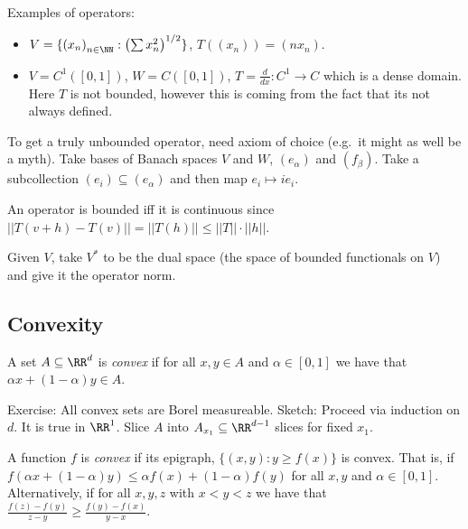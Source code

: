 \documentclass{../uva7310}
\begin{document}
Examples of operators: 
\begin{itemize}
    \item \(V=\{{(x_n)}_{n\in\NN}: {\left(\sum x_n^2\right)}^{1/2}\} \), \(T((x_n))=(nx_n)\).
    \item \(V=C^1([0,1])\), \(W=C([0,1])\), \(T=\frac{d}{dx}:C^1\rightarrow C\) which is a dense domain. Here \(T\) is
    not bounded, however this is coming from the fact that its not always defined.
\end{itemize}

To get a truly unbounded operator, need axiom of choice (e.g.\ it might as well be a myth). Take bases of Banach spaces
\(V\) and \(W\), \((e_\alpha)\) and \((f_\beta)\). Take a subcollection \((e_i)\subseteq (e_\alpha)\) and then map
\(e_i\mapsto ie_i\).

An operator is bounded iff it is continuous since \(||T(v+h)-T(v)||=||T(h)||\leq ||T||\cdot ||h||\).

Given \(V\), take \(V^*\) to be the dual space (the space of bounded functionals on \(V\)) and give it the operator
norm.

\subsection{Convexity}

\begin{definition}
    A set \(A\subseteq \RR^d\) is \textit{convex} if for all \(x,y\in A\) and \(\alpha\in[0,1]\) we have that
    \(\alpha x+(1-\alpha)y\in A\).
\end{definition}

Exercise: All convex sets are Borel measureable. Sketch: Proceed via induction on \(d\). It is true in \(\RR^1\). Slice
\(A\) into \(A_{x_1}\subseteq\RR^{d-1}\) slices for fixed \(x_1\).

\begin{definition}
    A function \(f\) is \textit{convex} if its epigraph, \( \{(x,y):y\geq f(x)\} \) is convex. That is, if
    \(f(\alpha x+(1-\alpha) y)\leq \alpha f(x)+(1-\alpha) f(y)\) for all \(x,y\) and \(\alpha\in[0,1]\). Alternatively,
    if for all \(x,y,z\) with \(x<y<z\) we have that \(\frac{f(z)-f(y)}{z-y}\geq \frac{f(y)-f(x)}{y-x}\).
\end{definition}
\end{document}
